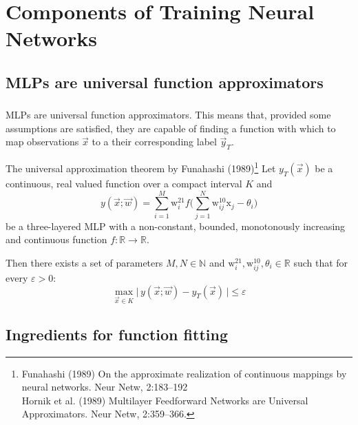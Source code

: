 \section{Components of Training Neural Networks}

\subsection{MLPs are universal function approximators}

\begin{frame}\frametitle{\subsecname}


MLPs are universal function approximators. This means that, provided some assumptions are satisfied, they are capable of finding a function with which to map observations $\vec x$ to a their corresponding label $\vec y_T$.

   \begin{block}{The universal approximation theorem by Funahashi (1989)\footnote
	{ Funahashi (1989) On the approximate realization of 
		continuous mappings by neural networks. Neur Netw, 2:183--192\\
		Hornik et al. (1989) Multilayer Feedforward Networks 
		are Universal Approximators. Neur Netw, 2:359--366. }}
	\small
    	Let $y_T{(\vec{x})}$ be a continuous, real valued function 
    	over a compact interval $K$ and     
		\begin{equation} 
		{y}{(\vec{x}; \vec w)} = \sum_{i=1}^M \mathrm{w}_i^{21} 
		f\Big( \sum\limits_{j=1}^N \mathrm{w}_{ij}^{10} 
		  \mathrm{x}_j - \theta_i \Big)
		 \end{equation}
    	be a three-layered MLP with a non-constant, bounded, 
    	monotonously increasing and continuous function 
    	$f: \mathbb{R} \rightarrow \mathbb{R}$.\\
		\vspace{4mm}
	   \pause

		Then there exists a set of parameters 
		$M, N \in \mathbb{N}$ and $\mathrm{w}_i^{21}, 
		\mathrm{w}_{ij}^{10}, \theta_i \in \mathbb{R}$ 
		such that for every $\varepsilon > 0$:
		\begin{equation}
		\max_{\vec{x} \in K} \Big| \,{y}{(\vec{x}; \vec w)} - y_T{(\vec{x})} \,\Big| 
		\leq \varepsilon
		 \end{equation}
  \end{block}
  
\end{frame}

\subsection{Ingredients for function fitting}

